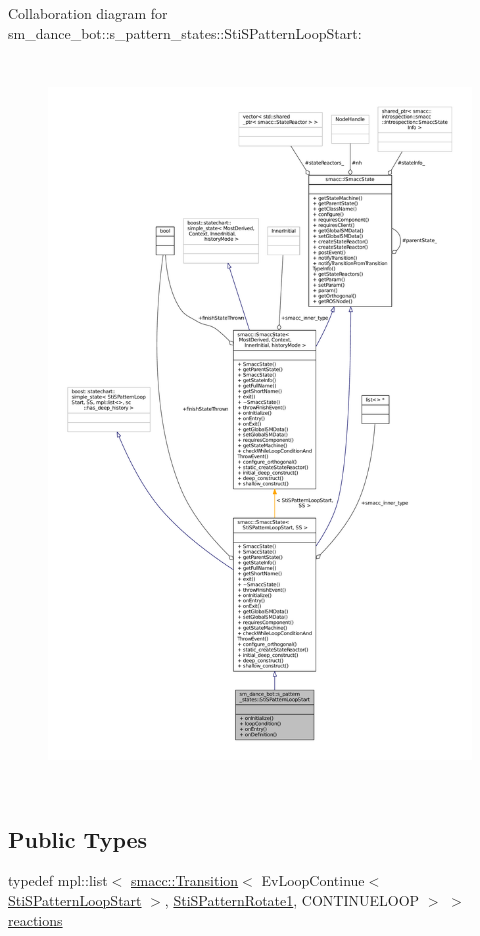 Collaboration diagram for sm\+\_\+dance\+\_\+bot\+:\+:s\+\_\+pattern\+\_\+states\+:\+:Sti\+S\+Pattern\+Loop\+Start\+:
\nopagebreak
\begin{figure}[H]
\begin{center}
\leavevmode
\includegraphics[height=550pt]{structsm__dance__bot_1_1s__pattern__states_1_1StiSPatternLoopStart__coll__graph}
\end{center}
\end{figure}
\subsection*{Public Types}
\begin{DoxyCompactItemize}
\item 
typedef mpl\+::list$<$ \hyperlink{classsmacc_1_1Transition}{smacc\+::\+Transition}$<$ Ev\+Loop\+Continue$<$ \hyperlink{structsm__dance__bot_1_1s__pattern__states_1_1StiSPatternLoopStart}{Sti\+S\+Pattern\+Loop\+Start} $>$, \hyperlink{structsm__dance__bot_1_1s__pattern__states_1_1StiSPatternRotate1}{Sti\+S\+Pattern\+Rotate1}, C\+O\+N\+T\+I\+N\+U\+E\+L\+O\+OP $>$ $>$ \hyperlink{structsm__dance__bot_1_1s__pattern__states_1_1StiSPatternLoopStart_a6ff2aba42c38aa2c9f5f1551dcabc170}{reactions}
\end{DoxyCompactItemize}
